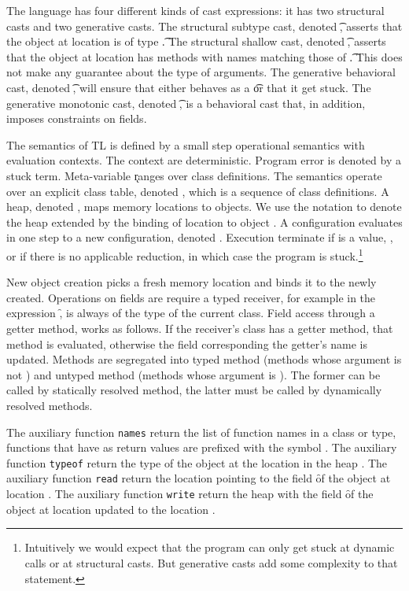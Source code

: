 \documentclass[a4paper,USenglish]{tex/lipics-v2016}
\begin{document}



The language has four different kinds of cast expressions: it has two
structural casts and two generative casts. The structural subtype cast,
denoted \SubCast\t\a, asserts that the object at location \a is of type
\t.  The structural shallow cast, denoted \ShaCast\t\a, asserts that the
object at location \a has methods with names matching those of \t. This does
not make any guarantee about the type of arguments.  The generative
behavioral cast, denoted \BehCast\t\a, will ensure that either \a behaves
as a \t or that it get stuck. The generative monotonic cast, denoted
\MonCast\t\a, is a behavioral cast that, in addition, imposes constraints
on fields.


The semantics of TL is defined by a small step operational semantics with
evaluation contexts.  The context are deterministic. Program error is
denoted by a stuck term. Meta-variable \k ranges over class definitions.
The semantics operate over an explicit class table, denoted \K, which is a
sequence of class definitions. A heap, denoted \s, maps memory locations to
objects. We use the notation \Heap\s{\Bind\a{\obj\C{\b\a}}} to denote the
heap \s extended by the binding of location \a to object \obj\C{\b\a}.  A
configuration \K\e\s evaluates in one step to a new configuration, denoted
\Reduce \K\e\s \Kp\ep\sp. Execution terminate if \ep\xspace is a value, \a,
or if there is no applicable reduction, in which case the program is
stuck.\footnote{Intuitively we would expect that the program can only get
  stuck at dynamic calls or at structural casts. But generative casts add
  some complexity to that statement.}

New object creation picks a fresh memory location \ap and binds it to the
newly created. Operations on fields are require a typed receiver, for
example in the expression \Get\this\f, \this is always of the type of the
current class. Field access through a getter method, works as follows. If
the receiver's class has a getter method, that method is evaluated,
otherwise the field corresponding the getter's name is updated. Methods are
segregated into typed method (methods whose argument is not \any) and
untyped method (methods whose argument is \any). The former can be called by
statically resolved method, the latter must be called by dynamically
resolved methods.

The auxiliary function \texttt{names} return the list of function names in a class
or type, functions that have \any as return values are prefixed with the
symbol \any. The auxiliary function \texttt{typeof} return the type of the object 
at the location \a in the heap \s. The auxiliary function \texttt{read} return
the location \ap pointing to the field \f of the object at location \a. The 
auxiliary function \texttt{write} return the heap \sp with the field \f of
the object at location \a updated to the location \ap.
\end{document}

